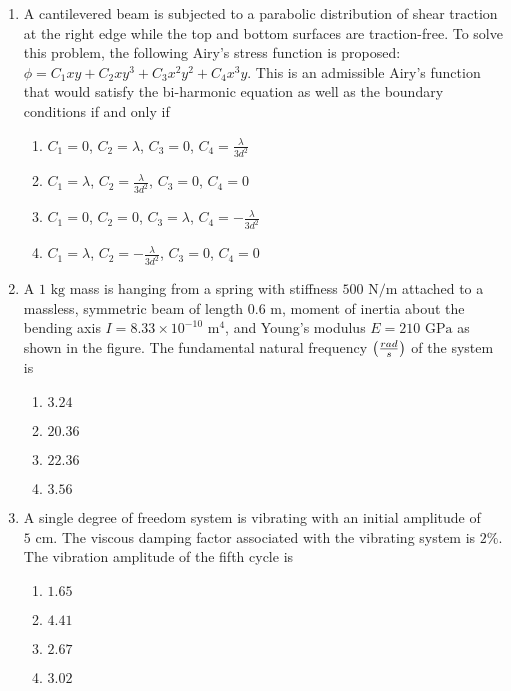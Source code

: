 \documentclass[journal,12pt,twocolumn]{IEEEtran}
\theoremstyle{remark}
\begin{document}
\begin{enumerate}[start=40]
    \item A cantilevered beam is subjected to a parabolic distribution of shear traction at the right edge while the top and bottom surfaces are traction-free. To solve this problem, the following Airy's stress function is proposed: $\phi = C_1 xy + C_2 xy^3 + C_3 x^2 y^2 + C_4 x^3 y$. This is an admissible Airy's function that would satisfy the bi-harmonic equation as well as the boundary conditions if and only if
    \begin{enumerate}
        \item $C_1 = 0$, $C_2 = \lambda$, $C_3 = 0$, $C_4 = \frac{\lambda}{3d^2}$
        \item $C_1 =\lambda$, $C_2 = \frac{\lambda}{3d^2}$, $C_3 = 0$, $C_4 = 0$
        \item $C_1 = 0$, $C_2 = 0$, $C_3 = \lambda$, $C_4 = -\frac{\lambda}{3d^2}$
        \item $C_1 = \lambda$, $C_2 = -\frac{\lambda}{3d^2}$, $C_3 = 0$, $C_4 = 0$
    \end{enumerate}

    \item A $1 \text{ kg}$ mass is hanging from a spring with stiffness $500 \text{ N/m}$ attached to a massless, symmetric beam of length $0.6 \text{ m}$, moment of inertia about the bending axis $I = 8.33 \times 10^{-10} \text{ m}^4$, and Young's modulus $E = 210 \text{ GPa}$ as shown in the figure. The fundamental natural frequency $\left(\frac{rad}{s}\right)$ of the system is
    \begin{enumerate}
        \item $3.24$
        \item $20.36$
        \item $22.36$
        \item $3.56$
    \end{enumerate}

    \item A single degree of freedom system is vibrating with an initial  amplitude of $5 \text{ cm}$. The viscous damping factor associated with the vibrating system is $2\%$. The vibration amplitude of the fifth cycle  is
    \begin{enumerate}
        \item $1.65$
        \item $4.41$
        \item $2.67$
        \item $3.02$
    \end{enumerate}


\end{enumerate}
\end{document}

